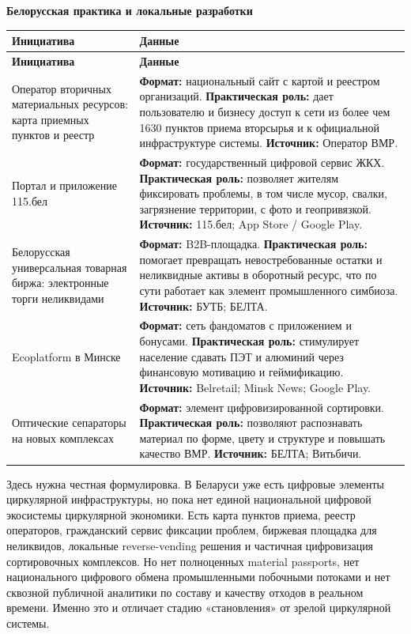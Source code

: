 \documentclass[14pt,a4paper]{extarticle}
\begin{document}
\textbf{Белорусская практика и локальные разработки}

\begin{longtable}{>{\raggedright\arraybackslash}p{5.0cm}>{\raggedright\arraybackslash}p{10.6cm}}
\toprule
\textbf{Инициатива} & \textbf{Данные} \\
\midrule
\endfirsthead
\toprule
\textbf{Инициатива} & \textbf{Данные} \\
\midrule
\endhead
Оператор вторичных материальных ресурсов: карта приемных пунктов и реестр & \textbf{Формат:} национальный сайт с картой и реестром организаций. \textbf{Практическая роль:} дает пользователю и бизнесу доступ к сети из более чем 1630 пунктов приема вторсырья и к официальной инфраструктуре системы. \textbf{Источник:} Оператор ВМР. \\
Портал и приложение 115.бел & \textbf{Формат:} государственный цифровой сервис ЖКХ. \textbf{Практическая роль:} позволяет жителям фиксировать проблемы, в том числе мусор, свалки, загрязнение территории, с фото и геопривязкой. \textbf{Источник:} 115.бел; App Store / Google Play. \\
Белорусская универсальная товарная биржа: электронные торги неликвидами & \textbf{Формат:} B2B-площадка. \textbf{Практическая роль:} помогает превращать невостребованные остатки и неликвидные активы в оборотный ресурс, что по сути работает как элемент промышленного симбиоза. \textbf{Источник:} БУТБ; БЕЛТА. \\
Ecoplatform в Минске & \textbf{Формат:} сеть фандоматов с приложением и бонусами. \textbf{Практическая роль:} стимулирует население сдавать ПЭТ и алюминий через финансовую мотивацию и геймификацию. \textbf{Источник:} Belretail; Minsk News; Google Play. \\
Оптические сепараторы на новых комплексах & \textbf{Формат:} элемент цифровизированной сортировки. \textbf{Практическая роль:} позволяют распознавать материал по форме, цвету и структуре и повышать качество ВМР. \textbf{Источник:} БЕЛТА; Витьбичи. \\
\bottomrule
\end{longtable}

Здесь нужна честная формулировка. В Беларуси уже есть цифровые элементы циркулярной инфраструктуры, но пока нет единой национальной цифровой экосистемы циркулярной экономики. Есть карта пунктов приема, реестр операторов, гражданский сервис фиксации проблем, биржевая площадка для неликвидов, локальные reverse-vending решения и частичная цифровизация сортировочных комплексов. Но нет полноценных material passports, нет национального цифрового обмена промышленными побочными потоками и нет сквозной публичной аналитики по составу и качеству отходов в реальном времени. Именно это и отличает стадию «становления» от зрелой циркулярной системы.
\end{document}
